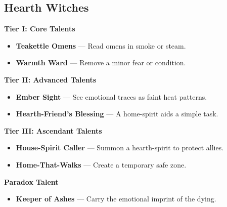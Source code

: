 \documentclass[11pt]{book}
\begin{document}
\subsection*{Hearth Witches}
\begin{tcolorbox}[colback=mistgray!10,colframe=lanternamber,title={Hearth Witch Talents}]

\textbf{Tier I: Core Talents}
\begin{itemize}[noitemsep]
  \item \textbf{Teakettle Omens} --- Read omens in smoke or steam.
  \item \textbf{Warmth Ward} --- Remove a minor fear or condition.
\end{itemize}

\textbf{Tier II: Advanced Talents}
\begin{itemize}[noitemsep]
  \item \textbf{Ember Sight} --- See emotional traces as faint heat patterns.
  \item \textbf{Hearth-Friend's Blessing} --- A home-spirit aids a simple task.
\end{itemize}

\textbf{Tier III: Ascendant Talents}
\begin{itemize}[noitemsep]
  \item \textbf{House-Spirit Caller} --- Summon a hearth-spirit to protect allies.
  \item \textbf{Home-That-Walks} --- Create a temporary safe zone.
\end{itemize}

\textbf{Paradox Talent}
\begin{itemize}[noitemsep]
  \item \textbf{Keeper of Ashes} --- Carry the emotional imprint of the dying.
\end{itemize}

\end{tcolorbox}

\end{document}
